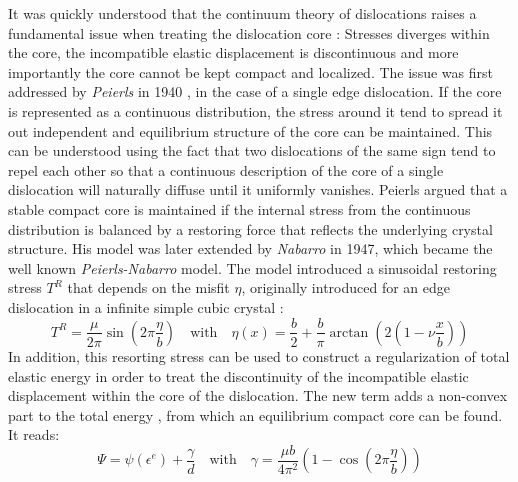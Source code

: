 \documentclass{article}
\begin{document}
It was quickly understood that the continuum theory of dislocations raises a fundamental issue when treating the dislocation core : Stresses diverges within the core, the incompatible elastic displacement is discontinuous and more importantly the core cannot be kept compact and localized. The issue was first addressed by \emph{Peierls} in 1940 \parencite{peierlssizedislocation1940}, in the case of a single edge dislocation. If the core is represented as a continuous distribution, the stress around it tend to spread it out independent and equilibrium structure of the core can be maintained. This can be understood using the fact that two dislocations of the same sign tend to repel each other so that a continuous description of the core of a single dislocation will naturally diffuse until it uniformly vanishes. Peierls \parencite{peierlssizedislocation1940} argued that a stable compact core is maintained if the internal stress from the continuous distribution is balanced by a restoring force that reflects the underlying crystal structure. His model was later extended by \emph{Nabarro} \parencite{nabarroDislocationssimple1947} in 1947, which became the well known \emph{Peierls-Nabarro} model. The model introduced a sinusoidal restoring stress $T^R$ that depends on the misfit $\eta$, originally introduced for an edge dislocation in a infinite simple cubic crystal :
\begin{equation}
    T^R = \frac{\mu}{2 \pi} \sin \left(2 \pi \frac{\eta}{b} \right) \quad  \text{with} \quad \eta(x) = \frac{b}{2}+\frac{b}{\pi} \arctan \left( 2(1-\nu \frac{x}{b})\right)
\end{equation}
In addition, this resorting stress can be used to construct a regularization of total elastic energy in order to treat the discontinuity of the incompatible elastic displacement within the core of the dislocation. The new term adds a non-convex part to the total energy \parencite{fressengeasMechanicsdislocation2017}, from which an equilibrium compact core can be found. It reads:
\begin{equation}
    \Psi = \psi(\epsilon^e) + \frac{\gamma}{d} \quad \text{with} \quad \gamma = \frac{\mu b }{4 \pi^2} \left( 1- \cos \left(2 \pi \frac{\eta}{b} \right) \right)
\end{equation}
\end{document}
